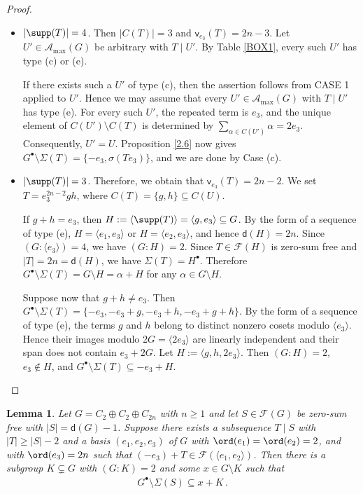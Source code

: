 \documentclass[a4paper, 10pt]{amsart}
\theoremstyle{plain}
\newtheorem{lemma}[theorem]{\bf Lemma}
\theoremstyle{definition}
\numberwithin{equation}{section}
\begin{document}
{\begin{proof}
\begin{itemize}
		\item[(ii)] $|\supp(T)|=4$. Then $|C(T)|=3$  and $\mathsf v_{e_3}(T)=2n-3$. Let $U'\in\mathcal A_{\max}(G)$ be arbitrary with $T\mid U'$. By Table \ref{BOX1}, every such $U'$ has type (c) or (e).
			
			If there exists such a $U'$ of type (c), then the assertion follows from CASE 1 applied to $U'$. Hence we may assume that every $U'\in\mathcal A_{\max}(G)$ with $T\mid U'$ has type (e). For every such $U'$, the repeated term is $e_3$, and the unique element of $C(U')\setminus C(T)$ is determined by $\sum_{\alpha\in C(U')}\alpha=2e_3$. Consequently, $U'=U$. Proposition \ref{2.6} now gives $G^{\bullet}\setminus\Sigma(T)=\{-e_3,\sigma(Te_3)\}$, and we are done by Case (c).
		
		\item[(iii)] $|\supp(T)|=3$. Therefore, we obtain that $\mathsf{v}_{e_3}(T)=2n-2$. We set $T= e_3^{2n-2} gh$, where $C(T)=\{g,h\}\subseteq C(U)$.
		
		
		
		If $g+h=e_3$, then $H:=\langle\supp(T)\rangle=\langle g,e_3\rangle \subseteq G$. By the form of a sequence of type (e), $H=\langle e_1,e_3\rangle$ or $H=\langle e_2,e_3\rangle$, and hence $\mathsf d(H)=2n$. Since $(G:\langle e_3\rangle)=4$, we have $(G:H)=2$. Since $T\in\mathcal F(H)$ is zero-sum free and $|T|=2n=\mathsf d(H)$, we have $\Sigma(T)=H^{\bullet}$. Therefore $G^{\bullet}\setminus\Sigma(T)=G\setminus H=\alpha+H$ for any $\alpha\in G\setminus H$.
		
		Suppose now that $g+h\ne e_3$. Then $G^{\bullet}\setminus\Sigma(T)=\{-e_3,-e_3+g,-e_3+h,-e_3+g+h\}$. By the form of a sequence of type (e), the terms $g$ and $h$ belong to distinct nonzero cosets modulo $\langle e_3\rangle$. Hence their images modulo $2G=\langle2e_3\rangle$ are linearly independent and their span does not contain $e_3+2G$. Let $H:=\langle g,h,2e_3\rangle$. Then $(G\colon H)=2$, $e_3\notin H$, and  $G^{\bullet}\setminus\Sigma(T)\subseteq-e_3+H$. \qedhere
\end{itemize}
\end{proof}

\begin{lemma} \label{4.6}
		Let $G=C_2 \oplus C_2 \oplus C_{2n}$ with $n \ge 1$ and let $S\in \mathcal F (G)$ be zero-sum free with $|S|=\mathsf d (G)-1$. Suppose there exists a subsequence $T \mid S$ with $|T|\ge |S|-2$ and 
	a basis $(e_1,e_2,e_3)$ of $G$ with $\ord (e_1)=\ord (e_2)=2$, and with $\ord (e_3)=2n$ such that $(-e_3)+T\in \mathcal{F}(\langle e_1,e_2\rangle)$. Then there is a subgroup $K \subsetneq G$ with $(G : K) = 2$  and some $x \in G \setminus K$ such that
	\begin{align*}
	G^{\bullet} \setminus \Sigma (S) \subseteq x + K \,.
	\end{align*}
\end{lemma}

}
\end{document}
